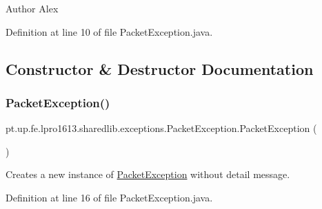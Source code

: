 \begin{DoxyAuthor}{Author}
Alex 
\end{DoxyAuthor}


Definition at line 10 of file Packet\+Exception.\+java.



\subsection{Constructor \& Destructor Documentation}
\hypertarget{classpt_1_1up_1_1fe_1_1lpro1613_1_1sharedlib_1_1exceptions_1_1_packet_exception_ad33ebb985e775f252fff77d7d859ac58}{}\label{classpt_1_1up_1_1fe_1_1lpro1613_1_1sharedlib_1_1exceptions_1_1_packet_exception_ad33ebb985e775f252fff77d7d859ac58} 
\subsubsection{\texorpdfstring{Packet\+Exception()}{PacketException()}\hspace{0.1cm}{\footnotesize\ttfamily [1/4]}}
{\footnotesize\ttfamily pt.\+up.\+fe.\+lpro1613.\+sharedlib.\+exceptions.\+Packet\+Exception.\+Packet\+Exception (\begin{DoxyParamCaption}{ }\end{DoxyParamCaption})}

Creates a new instance of {\ttfamily \hyperlink{classpt_1_1up_1_1fe_1_1lpro1613_1_1sharedlib_1_1exceptions_1_1_packet_exception}{Packet\+Exception}} without detail message. 

Definition at line 16 of file Packet\+Exception.\+java.

\hypertarget{classpt_1_1up_1_1fe_1_1lpro1613_1_1sharedlib_1_1exceptions_1_1_packet_exception_a8710c289a2dd416a1ad7d25248021f9d}{}\label{classpt_1_1up_1_1fe_1_1lpro1613_1_1sharedlib_1_1exceptions_1_1_packet_exception_a8710c289a2dd416a1ad7d25248021f9d} 
